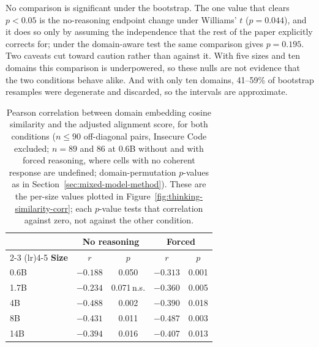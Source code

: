 \documentclass{article}
\begin{document}
No comparison is significant under the bootstrap. The one value that clears $p<0.05$ is the
no-reasoning endpoint change under Williams' $t$ ($p=0.044$), and it does so only by assuming
the independence that the rest of the paper explicitly corrects for; under the domain-aware
test the same comparison gives $p=0.195$. Two caveats cut toward caution rather than against
it. With five sizes and ten domains this comparison is underpowered, so these nulls are not
evidence that the two conditions behave alike. And with only ten domains, 41--59\% of bootstrap
resamples were degenerate and discarded, so the intervals are approximate.

\begin{table}[t]
\captionsetup{font=normalsize,skip=3pt}
\caption{Pearson correlation between domain embedding cosine similarity and the adjusted alignment score, for both conditions ($n \leq 90$ off-diagonal pairs, Insecure Code excluded; $n=89$ and $86$ at 0.6B without and with forced reasoning, where cells with no coherent response are undefined; domain-permutation $p$-values as in Section~\ref{sec:mixed-model-method}). These are the per-size values plotted in Figure~\ref{fig:thinking-similarity-corr}; each $p$-value tests that correlation against zero, not against the other condition.}
\label{tab:thinking-similarity}
\centering
\scriptsize
\renewcommand{\arraystretch}{0.84}
\setlength{\tabcolsep}{2pt}
\begin{tabular}{lcccc}
\toprule
& \multicolumn{2}{c}{\textbf{No reasoning}} & \multicolumn{2}{c}{\textbf{Forced}} \\
\cmidrule(lr){2-3} \cmidrule(lr){4-5}
\textbf{Size} & \textbf{$r$} & \textbf{$p$} & \textbf{$r$} & \textbf{$p$} \\
\midrule
0.6B & $-0.188$ & 0.050        & $-0.313$ & 0.001 \\
1.7B & $-0.234$ & 0.071\,n.s.  & $-0.360$ & 0.005 \\
4B   & $-0.488$ & 0.002        & $-0.390$ & 0.018 \\
8B   & $-0.431$ & 0.011        & $-0.487$ & 0.003 \\
14B  & $-0.394$ & 0.016        & $-0.407$ & 0.013 \\
\bottomrule
\end{tabular}
\end{table}
\end{document}

